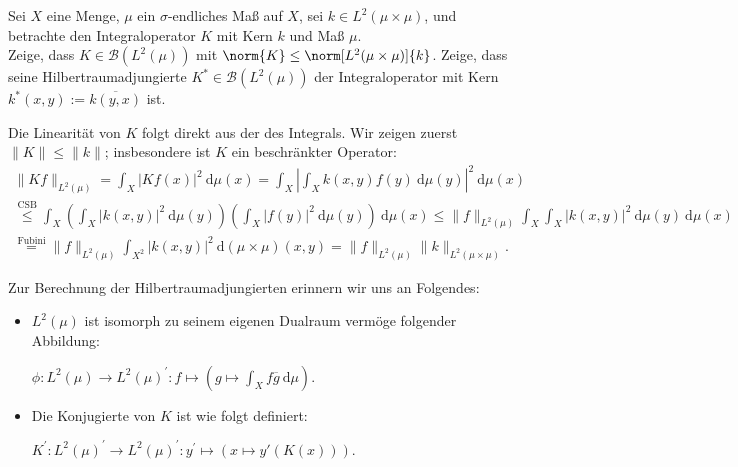\begin{exercise}[IO/1]

Sei $X$ eine Menge, $\mu$ ein $\sigma$-endliches Maß auf $X$, sei $k \in L^2(\mu \times \mu)$, und betrachte den Integraloperator $K$ mit Kern $k$ und Maß $\mu$. \\

Zeige, dass $K \in \mathcal{B}(L^2(\mu))$ mit $\norm{K} \leq \norm[L^2(\mu \times \mu)]{k}$.
Zeige, dass seine Hilbertraumadjungierte $K^\ast \in \mathcal{B}(L^2(\mu))$ der Integraloperator mit Kern $k^\ast(x, y) := \overline{k(y, x)}$ ist.

\end{exercise}

\begin{solution}
  Die Linearität von $K$ folgt direkt aus der des Integrals.
  Wir zeigen zuerst $\|K\| \leq \|k\|$; insbesondere ist $K$ ein beschränkter Operator:
  \begin{align*}
    \|Kf\|_{L^2(\mu)} = \int_X |Kf(x)|^2 ~\mathrm{d}\mu(x)
    = \int_X \left|\int_X k(x,y) f(y) ~\mathrm{d}\mu(y)\right|^2 ~\mathrm{d}\mu(x) \\
    \stackrel{\text{CSB}}{\leq} \int_X \left(\int_X |k(x,y)|^2  ~\mathrm{d}\mu(y)\right) \left(\int_X |f(y)|^2 ~\mathrm{d}\mu(y)\right)
    ~\mathrm{d}\mu(x) \leq \|f\|_{L^2(\mu)} \int_X \int_X |k(x,y)|^2 ~\mathrm{d}\mu(y) ~\mathrm{d}\mu(x) \\ \stackrel{\text{Fubini}}{=} \|f\|_{L^2(\mu)} \int_{X^2} |k(x,y)|^2 ~\mathrm{d}(\mu\times\mu)(x,y)
    = \|f\|_{L^2(\mu)} \|k\|_{L^2(\mu\times\mu)}.
\end{align*}

  Zur Berechnung der Hilbertraumadjungierten erinnern wir uns an Folgendes:

  \begin{itemize}
      \item $L^2(\mu)$ ist isomorph zu seinem eigenen Dualraum vermöge folgender Abbildung:

      $\phi: L^2(\mu) \rightarrow L^2(\mu)^\prime: f \mapsto
      (g \mapsto \int_X f\overline{g} ~\mathrm{d}\mu).$
      \item Die Konjugierte von $K$ ist wie folgt definiert:

      $K^\prime: L^2(\mu)^\prime \rightarrow L^2(\mu)^\prime:
      y^\prime \mapsto (x \mapsto y'(K(x))).$
  \end{itemize}


\end{solution}
